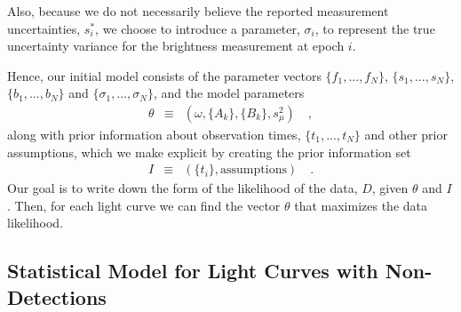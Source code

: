 \documentclass[12pt,preprint]{aastex}
\newcommand{\sobs}{s_i^*}
\begin{document}
Also, because we do not necessarily believe the reported measurement uncertainties, $\sobs$, we choose to introduce a parameter, $\sigma_i$, to represent the true uncertainty variance for the brightness measurement at epoch $i$.

Hence, our initial model consists of the parameter vectors $\{f_1,...,f_N\}$, $\{s_1,...,s_N\}$, $\{b_1,...,b_N\}$ and $\{\sigma_1,...,\sigma_N\}$, and the model parameters
\begin{eqnarray}\displaystyle
\theta &\equiv& (\omega, \{A_k\}, \{B_k\}, s_\mu^2) \quad ,
\end{eqnarray}
along with prior information about observation times, $\{t_1,...,t_N\}$ and other prior assumptions, which we make explicit by creating the prior information set
\begin{eqnarray}\displaystyle
I &\equiv& (\{t_i\}, \mbox{assumptions}) \quad .
\end{eqnarray}
Our goal is to write down the form of the likelihood of the data, $D$, given $\theta$ and $I$.  Then, for each light curve we can find the vector $\theta$ that maximizes the data likelihood.


\subsection{Statistical Model for Light Curves with Non-Detections}
\end{document}
